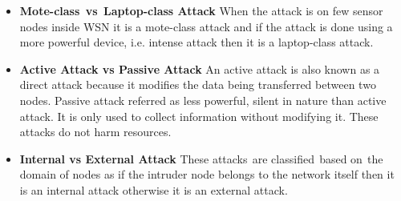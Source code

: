 \begin{itemize}
  \item{ \textbf{Mote-class\textcolor{white}{e}vs\textcolor{white}{e}Laptop-class Attack} When the attack is on few sensor nodes inside WSN it is a mote-class attack and if the attack is done using a more powerful device, i.e. intense attack then it is a laptop-class attack.} 
  \item{ \textbf{Active Attack vs Passive Attack} An active attack is also known as a direct attack because it modifies the data being transferred between two nodes. Passive attack referred as less powerful, silent in nature than active attack. It is only used to collect information without modifying it. These attacks do not harm resources.}
  \item{ \textbf{Internal vs External Attack} These attacks\textcolor{white}{e}are classified\textcolor{white}{e}based on\textcolor{white}{e}the domain of nodes as if the intruder node belongs to the network itself then it is an internal attack otherwise it is an external attack.}
\end{itemize}

\noindent

